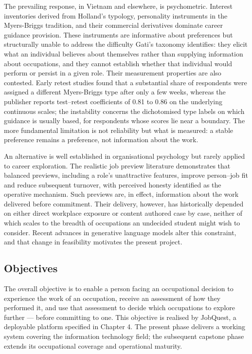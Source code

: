 The prevailing response, in Vietnam and elsewhere, is psychometric. Interest inventories derived from Holland's typology, personality instruments in the Myers-Briggs tradition, and their commercial derivatives dominate career guidance provision. These instruments are informative about preferences but structurally unable to address the difficulty Gati's taxonomy identifies: they elicit what an individual believes about themselves rather than supplying information about occupations, and they cannot establish whether that individual would perform or persist in a given role. Their measurement properties are also contested. Early retest studies found that a substantial share of respondents were assigned a different Myers-Briggs type after only a few weeks\cite{r6}, whereas the publisher reports test--retest coefficients of 0.81 to 0.86 on the underlying continuous scales\cite{r7}; the instability concerns the dichotomised type labels on which guidance is usually based, for respondents whose scores lie near a boundary. The more fundamental limitation is not reliability but what is measured: a stable preference remains a preference, not information about the work.

An alternative is well established in organisational psychology but rarely applied to career exploration. The realistic job preview literature demonstrates that balanced previews, including a role's unattractive features, improve person--job fit and reduce subsequent turnover, with perceived honesty identified as the operative mechanism\cite{r8,r9}. Such previews are, in effect, information about the work delivered before commitment. Their delivery, however, has historically depended on either direct workplace exposure or content authored case by case, neither of which scales to the breadth of occupations an undecided student might wish to consider. Recent advances in generative language models alter this constraint, and that change in feasibility motivates the present project.

\subsection{Objectives}

The overall objective is to enable a person facing an occupational decision to experience the work of an occupation, receive an assessment of how they performed it, and use that assessment to decide which occupations to explore further --- before committing to one. This objective is realised by JobQuest, a deployable platform specified in Chapter 4. The present phase delivers a working system covering the information technology field; the subsequent capstone phase extends its occupational coverage and operational maturity.

